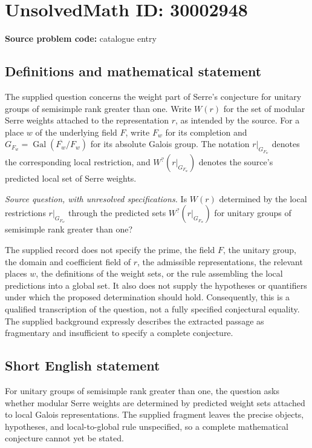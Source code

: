 \documentclass[11pt]{article}
\begin{document}
\section*{UnsolvedMath ID: 30002948}
\textbf{Source problem code:} catalogue entry
\subsection{Definitions and mathematical statement}
The supplied question concerns the weight part of Serre's conjecture for unitary groups of semisimple rank greater than one. Write \(W(r)\) for the set of modular Serre weights attached to the representation \(r\), as intended by the source. For a place \(w\) of the underlying field \(F\), write \(F_w\) for its completion and \(G_{F_w}=\operatorname{Gal}(\overline{F_w}/F_w)\) for its absolute Galois group. The notation \(r|_{G_{F_w}}\) denotes the corresponding local restriction, and \(W^{?}(r|_{G_{F_w}})\) denotes the source's predicted local set of Serre weights.

\emph{Source question, with unresolved specifications.} Is \(W(r)\) determined by the local restrictions \(r|_{G_{F_w}}\) through the predicted sets \(W^{?}(r|_{G_{F_w}})\) for unitary groups of semisimple rank greater than one?

The supplied record does not specify the prime, the field \(F\), the unitary group, the domain and coefficient field of \(r\), the admissible representations, the relevant places \(w\), the definitions of the weight sets, or the rule assembling the local predictions into a global set. It also does not supply the hypotheses or quantifiers under which the proposed determination should hold. Consequently, this is a qualified transcription of the question, not a fully specified conjectural equality. The supplied background expressly describes the extracted passage as fragmentary and insufficient to specify a complete conjecture.
\subsection{Short English statement}
For unitary groups of semisimple rank greater than one, the question asks whether modular Serre weights are determined by predicted weight sets attached to local Galois representations. The supplied fragment leaves the precise objects, hypotheses, and local-to-global rule unspecified, so a complete mathematical conjecture cannot yet be stated.
\end{document}
